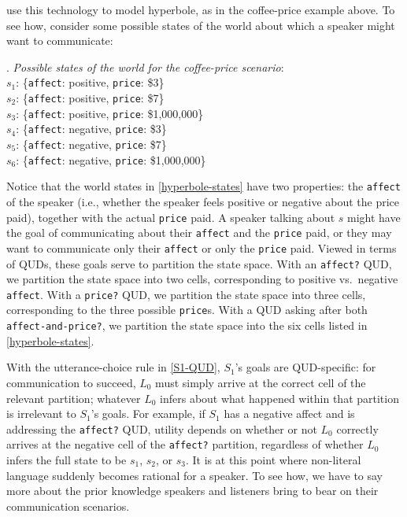 \documentclass{sp}
\begin{document}
\cite{kaoetal2014} use this technology to model hyperbole, as in the coffee-price example above. To see how, consider some possible states of the world about which a speaker might want to communicate:

\ex. \label{hyperbole-states}
\emph{Possible states of the world for the coffee-price scenario}:\\
$s_1$: \{\texttt{affect}: positive, \texttt{price}: \$3\}\\
$s_2$: \{\texttt{affect}: positive, \texttt{price}: \$7\}\\
$s_3$: \{\texttt{affect}: positive, \texttt{price}: \$1,000,000\}\\
$s_4$: \{\texttt{affect}: negative, \texttt{price}: \$3\}\\
$s_5$: \{\texttt{affect}: negative, \texttt{price}: \$7\}\\
$s_6$: \{\texttt{affect}: negative, \texttt{price}: \$1,000,000\}

Notice that the world states in \ref{hyperbole-states} have two properties: the \texttt{affect} of the speaker (i.e., whether the speaker feels positive or negative about the price paid), together with the actual \texttt{price} paid. A speaker talking about $s$ might have the goal of communicating about their \texttt{affect} and the \texttt{price} paid, or they may want to communicate only their \texttt{affect} or only the \texttt{price} paid. Viewed in terms of QUDs, these goals serve to partition the state space. With an \texttt{affect?} QUD, we partition the state space into two cells, corresponding to positive vs.~negative \texttt{affect}. With a \texttt{price?} QUD, we partition the state space into three cells, corresponding to the three possible \texttt{price}s. With a QUD asking after both \texttt{affect-and-price?}, we partition the state space into the six cells listed in \ref{hyperbole-states}.

With the utterance-choice rule in \eqref{S1-QUD}, $S_1$'s goals are QUD-specific: for communication to succeed, $L_0$ must simply arrive at the correct cell of the relevant partition; whatever $L_0$ infers about what happened within that partition is irrelevant to $S_1$'s goals. For example, if $S_1$ has a negative affect and is addressing the \texttt{affect?} QUD, utility depends on whether or not $L_0$ correctly arrives at the negative cell of the \texttt{affect?} partition, regardless of whether $L_0$ infers the full state to be $s_1$, $s_2$, or $s_3$. It is at this point where non-literal language suddenly becomes rational for a speaker. To see how, we have to say more about the prior knowledge speakers and listeners bring to bear on their communication scenarios.
\end{document}

